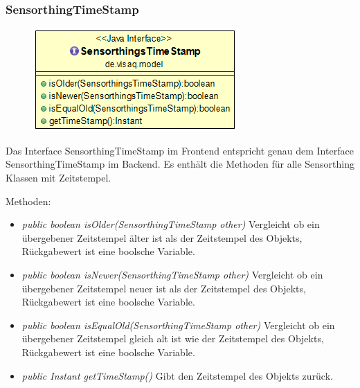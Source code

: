 \subsubsection {SensorthingTimeStamp}
\begin{minipage}{0.3\textwidth}
	\begin{figure}[H]
		\includegraphics[scale = 0.5
		]{media/frontend/model/SensorthingTimeStamp_Class.png}
	\end{figure}
\end{minipage} \hfill
\begin{minipage}{0.6\textwidth}
	Das Interface SensorthingTimeStamp im Frontend entspricht genau dem Interface SensorthingTimeStamp im Backend. Es enthält die Methoden für alle Sensorthing Klassen mit Zeitstempel.
\end{minipage}

Methoden:
\begin{itemize} 
	\item \emph{public boolean isOlder(SensorthingTimeStamp other)} Vergleicht ob ein übergebener Zeitstempel älter ist als der Zeitstempel des Objekts, Rückgabewert ist eine boolsche Variable.
	\item \emph{public boolean isNewer(SensorthingTimeStamp other)} Vergleicht ob ein übergebener Zeitstempel neuer ist als der Zeitstempel des Objekts, Rückgabewert ist eine boolsche Variable.
	\item \emph{public boolean isEqualOld(SensorthingTimeStamp other)} Vergleicht ob ein übergebener Zeitstempel gleich alt ist wie der Zeitstempel des Objekts, Rückgabewert ist eine boolsche Variable.
	\item \emph{public Instant getTimeStamp()} Gibt den Zeitstempel des Objekts zurück.
\end{itemize}


